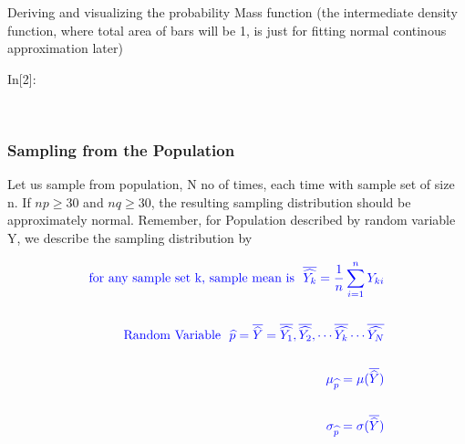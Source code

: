 \documentclass[float=false,crop=false]{standalone}
\begin{document}
    Deriving and visualizing the probability Mass function (the intermediate
density function, where total area of bars will be 1, is just for
fitting normal continous approximation later)
\begin{InVerbatim}[commandchars=\\\{\},fontsize=\scriptsize]
{\color{incolor}In[{\color{incolor}2}]:}    
        
           
          
\end{InVerbatim}
    \begin{center}
    \end{center}
    { \hspace*{\fill} \\}
    
    \subsubsection{Sampling from the
Population}\label{sampling-from-the-population}

Let us sample from population, N no of times, each time with sample set
of size n. If \(np \geq 30\) and \(nq \geq 30\), the resulting sampling
distribution should be approximately normal. Remember, for Population
described by random variable Y, we describe the sampling distribution by

\begin{equation}
\color {blue}{
\begin{aligned}
\text{for any sample set k, sample mean is} \ \ \overline{\widehat{Y_k}} = \dfrac {1}{n} \sum\limits_{i=1}^n Y_{ki} \\ \\
\text{Random Variable} \ \ \widehat{p} =  \overline{\widehat{Y}} =  \overline{\widehat{Y_1}},\overline{\widehat{Y_2}},\cdots\overline{\widehat{Y_k}}\cdots\overline{\widehat{Y_N}} \\ \\
\mu_{\widehat{p}} = \mu(\overline{\widehat{Y}}) \\ \\
\sigma_{\widehat{p}} = \sigma(\overline{\widehat{Y}})
\end{aligned}
}
\end{equation}
\end{document}
